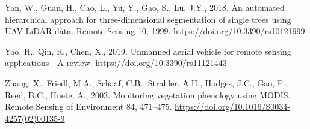 \documentclass[]{article}
\begin{document}
\leavevmode\hypertarget{ref-Yan2018a}{}%
Yan, W., Guan, H., Cao, L., Yu, Y., Gao, S., Lu, J.Y., 2018. An
automated hierarchical approach for three-dimensional segmentation of
single trees using UAV LiDAR data. Remote Sensing 10, 1999.
\url{https://doi.org/10.3390/rs10121999}

\leavevmode\hypertarget{ref-Yao2019b}{}%
Yao, H., Qin, R., Chen, X., 2019. Unmanned aerial vehicle for remote
sensing applications - A review.
\url{https://doi.org/10.3390/rs11121443}

\leavevmode\hypertarget{ref-Zhang2003}{}%
Zhang, X., Friedl, M.A., Schaaf, C.B., Strahler, A.H., Hodges, J.C.,
Gao, F., Reed, B.C., Huete, A., 2003. Monitoring vegetation phenology
using MODIS. Remote Sensing of Environment 84, 471--475.
\url{https://doi.org/10.1016/S0034-4257(02)00135-9}
\end{document}
